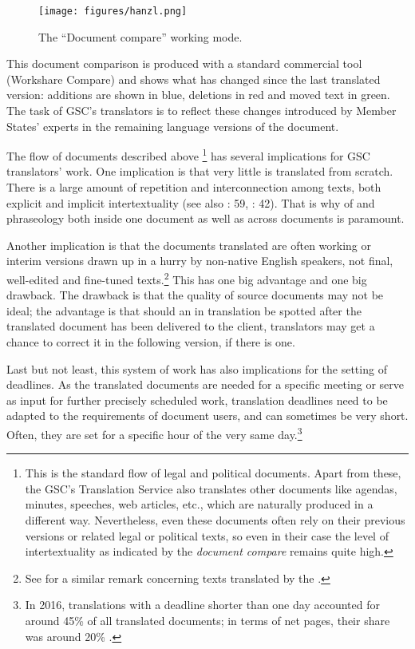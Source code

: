 \documentclass[output=paper]{langsci/langscibook}
\begin{document}
\begin{figure}
\texttt{[image: figures/hanzl.png]}
\caption{The ``Document compare'' working mode.}
\label{fig:hanzl:1}
\end{figure}

   
This document comparison is produced with a standard commercial tool (Workshare Compare) and shows what has changed since the last translated version: additions are shown in blue, deletions in red and moved text in green. The task of GSC's translators is to reflect these changes introduced by Member States' experts in the remaining language versions of the document.

The flow of documents described above \footnote{This is the standard flow of legal and political documents. Apart from these, the GSC's Translation Service also translates other documents like agendas, minutes, speeches, web articles, etc., which are naturally produced in a different way. Nevertheless, even these documents often rely on their previous versions or related legal or political texts, so even in their case the level of intertextuality as indicated by the \textit{document compare} remains quite high.} has several implications for GSC translators' work. One implication is that very little is translated from scratch. There is a large amount of repetition and interconnection among texts, both explicit and implicit intertextuality (see also \citealt{Koskinen2000}: 59, \citealt{Robertson2015}: 42). That is why  of  and phraseology both inside one document as well as across documents is paramount.

Another implication is that the documents translated are often working or interim versions drawn up in a hurry by non-native English speakers, not final, well-edited and fine-tuned texts.\footnote{See \citet{Stefaniak2013} for a similar remark concerning texts translated by the .} This has one big advantage and one big drawback. The drawback is that the quality of source documents may not be ideal; the advantage is that should an  in translation be spotted after the translated document has been delivered to the client, translators may get a chance to correct it in the following version, if there is one.

\largerpage
Last but not least, this system of work has also implications for the setting of deadlines. As the translated documents are needed for a specific meeting or serve as input for further precisely scheduled work, translation deadlines need to be adapted to the requirements of document users, and can sometimes be very short. Often, they are set for a specific hour of the very same day.\footnote{In 2016, translations with a deadline shorter than one day accounted for around 45\% of all translated documents; in terms of net pages, their share was around 20\% \citep{Council2017}.}
\end{document}
